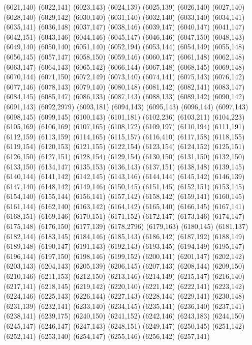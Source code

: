 (6021,140)
(6022,141)
(6023,143)
(6024,139)
(6025,139)
(6026,140)
(6027,140)
(6028,140)
(6029,142)
(6030,140)
(6031,140)
(6032,140)
(6033,140)
(6034,141)
(6035,141)
(6036,148)
(6037,147)
(6038,146)
(6039,147)
(6040,147)
(6041,147)
(6042,151)
(6043,146)
(6044,146)
(6045,147)
(6046,146)
(6047,150)
(6048,143)
(6049,140)
(6050,140)
(6051,140)
(6052,194)
(6053,144)
(6054,149)
(6055,148)
(6056,145)
(6057,147)
(6058,150)
(6059,146)
(6060,147)
(6061,148)
(6062,148)
(6063,147)
(6064,143)
(6065,142)
(6066,144)
(6067,148)
(6068,145)
(6069,148)
(6070,144)
(6071,150)
(6072,149)
(6073,140)
(6074,141)
(6075,143)
(6076,142)
(6077,146)
(6078,143)
(6079,140)
(6080,148)
(6081,142)
(6082,141)
(6083,147)
(6084,145)
(6085,147)
(6086,133)
(6087,143)
(6088,133)
(6089,142)
(6090,142)
(6091,143)
(6092,2979)
(6093,181)
(6094,143)
(6095,143)
(6096,144)
(6097,143)
(6098,145)
(6099,145)
(6100,143)
(6101,181)
(6102,236)
(6103,211)
(6104,223)
(6105,169)
(6106,169)
(6107,165)
(6108,172)
(6109,197)
(6110,194)
(6111,191)
(6112,159)
(6113,159)
(6114,165)
(6115,157)
(6116,410)
(6117,158)
(6118,155)
(6119,154)
(6120,153)
(6121,155)
(6122,154)
(6123,154)
(6124,152)
(6125,151)
(6126,150)
(6127,151)
(6128,154)
(6129,154)
(6130,150)
(6131,150)
(6132,150)
(6133,150)
(6134,147)
(6135,153)
(6136,143)
(6137,151)
(6138,148)
(6139,145)
(6140,144)
(6141,142)
(6142,145)
(6143,146)
(6144,144)
(6145,142)
(6146,139)
(6147,140)
(6148,142)
(6149,146)
(6150,145)
(6151,145)
(6152,151)
(6153,145)
(6154,140)
(6155,144)
(6156,141)
(6157,142)
(6158,142)
(6159,141)
(6160,145)
(6161,144)
(6162,140)
(6163,142)
(6164,142)
(6165,140)
(6166,145)
(6167,141)
(6168,151)
(6169,146)
(6170,151)
(6171,152)
(6172,147)
(6173,146)
(6174,147)
(6175,148)
(6176,150)
(6177,139)
(6178,2796)
(6179,163)
(6180,145)
(6181,137)
(6182,144)
(6183,145)
(6184,146)
(6185,143)
(6186,142)
(6187,192)
(6188,149)
(6189,148)
(6190,147)
(6191,143)
(6192,143)
(6193,145)
(6194,149)
(6195,147)
(6196,144)
(6197,150)
(6198,146)
(6199,152)
(6200,141)
(6201,147)
(6202,142)
(6203,143)
(6204,143)
(6205,139)
(6206,145)
(6207,143)
(6208,144)
(6209,150)
(6210,146)
(6211,153)
(6212,150)
(6213,146)
(6214,149)
(6215,147)
(6216,140)
(6217,141)
(6218,145)
(6219,142)
(6220,140)
(6221,142)
(6222,141)
(6223,142)
(6224,146)
(6225,143)
(6226,144)
(6227,143)
(6228,144)
(6229,141)
(6230,148)
(6231,139)
(6232,141)
(6233,140)
(6234,145)
(6235,141)
(6236,140)
(6237,141)
(6238,141)
(6239,175)
(6240,150)
(6241,152)
(6242,146)
(6243,183)
(6244,150)
(6245,147)
(6246,147)
(6247,143)
(6248,151)
(6249,147)
(6250,145)
(6251,142)
(6252,141)
(6253,140)
(6254,147)
(6255,146)
(6256,142)
(6257,141)

